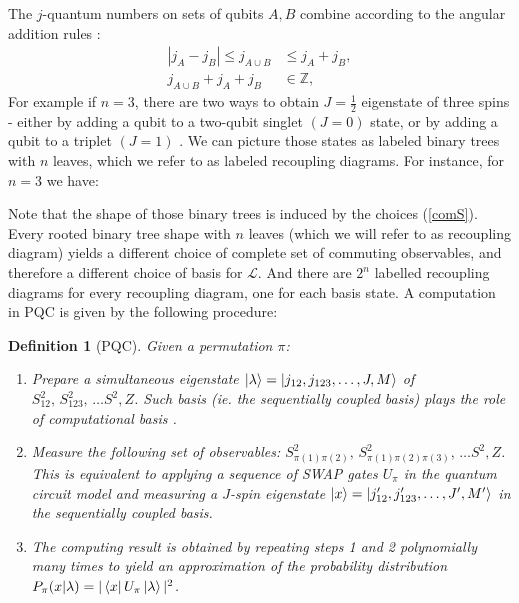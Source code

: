 \documentclass{article}
\newtheorem{definition}{Definition}
\begin{document}
The $j$-quantum numbers on sets of qubits $A,B$ combine according to the angular addition rules \cite{Woit17}: 
\begin{align*}
|j_A - j_B| \leq j_{A \cup B} &\leq j_A + j_B, \\
j_{A \cup B} + j_A + j_B & \in \mathbb{Z},
\end{align*}
For example if $n=3$, there are two ways to obtain $J=\frac{1}{2}$ eigenstate of three spins - either by adding a qubit to a two-qubit singlet $(J=0)$ state, or by adding a qubit to a triplet $(J=1)$ \cite{Pauncz67}.
We can picture those states as labeled binary trees with $n$ leaves, which we refer to as labeled recoupling diagrams. For instance, for $n=3$ we have:

Note that the shape of those binary trees is induced by the choices (\ref{comS}). Every rooted binary tree shape with $n$ leaves (which we will refer to as recoupling diagram) yields a different choice of complete set of commuting observables, and therefore a different choice of basis for $\mathcal{L}$. And there are $2^n$ labelled recoupling diagrams for every recoupling diagram, one for each basis state.
A computation in PQC is given by the following procedure:
\begin{definition}[PQC]\label{pqcomputation} 
	Given a permutation $\pi$: %
	\begin{enumerate}
		\item Prepare a simultaneous eigenstate $\ket{\lambda} = \ket{j_{12}, j_{123}, \ldots, J, M}$ of $ S_{12}^2, \, S_{123}^2, \, \ldots S^2, Z$. Such basis (ie. the sequentially coupled basis) plays the role of computational basis .  %
		\item Measure the following  set of observables: $S_{ \pi(1)\pi(2) }^2, \, S_{ \pi(1)\pi(2)\pi(3) }^2, \, \ldots S^2, Z$. This is equivalent to applying a sequence of \textsf{SWAP} gates $U_\pi$ in the quantum circuit model and measuring a $J$-spin eigenstate $\ket{x} = \ket{j_{12}', j_{123}', \ldots, J', M'}$ in the sequentially coupled basis.	
		\item The computing result is obtained by repeating steps 1 and 2 polynomially many times to yield an approximation of the probability distribution $P_\pi (x|\lambda) = | \bra{x} U_\pi \ket{\lambda}|^2 $.
	\end{enumerate}
\end{definition}
\end{document}
